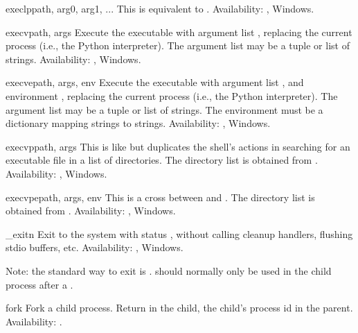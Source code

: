 \begin{funcdesc}{execlp}{path, arg0, arg1, ...}
This is equivalent to
.
Availability: \UNIX{}, Windows.
\end{funcdesc}

\begin{funcdesc}{execv}{path, args}
Execute the executable  with argument list ,
replacing the current process (i.e., the Python interpreter).
The argument list may be a tuple or list of strings.
Availability: \UNIX{}, Windows.
\end{funcdesc}

\begin{funcdesc}{execve}{path, args, env}
Execute the executable  with argument list ,
and environment ,
replacing the current process (i.e., the Python interpreter).
The argument list may be a tuple or list of strings.
The environment must be a dictionary mapping strings to strings.
Availability: \UNIX{}, Windows.
\end{funcdesc}

\begin{funcdesc}{execvp}{path, args}
This is like  but duplicates
the shell's actions in searching for an executable file in a list of
directories.  The directory list is obtained from
.
Availability: \UNIX{}, Windows.
\end{funcdesc}

\begin{funcdesc}{execvpe}{path, args, env}
This is a cross between  and .
The directory list is obtained from .
Availability: \UNIX{}, Windows.
\end{funcdesc}

\begin{funcdesc}{_exit}{n}
Exit to the system with status , without calling cleanup
handlers, flushing stdio buffers, etc.
Availability: \UNIX{}, Windows.

Note: the standard way to exit is .
 should normally only be used in the child process
after a .
\end{funcdesc}

\begin{funcdesc}{fork}{}
Fork a child process.  Return  in the child, the child's
process id in the parent.
Availability: \UNIX{}.
\end{funcdesc}

